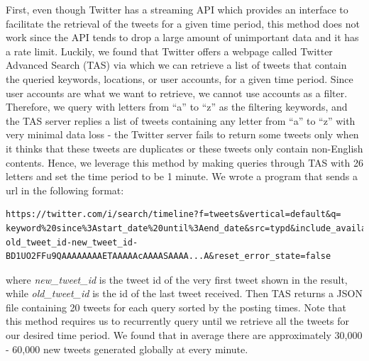 \documentclass[letterpaper,12pt]{article}
\begin{document}
First, even though Twitter has a streaming API which provides an interface to facilitate the retrieval of the tweets for a given time period, this method does not work since the API tends to drop a large amount of unimportant data and it has a rate limit. Luckily, we found that Twitter offers a webpage called Twitter Advanced Search (TAS) via which we can retrieve a list of tweets that contain the queried keywords, locations, or user accounts, for a given time period.
Since user accounts are what we want to
retrieve, we cannot use accounts as a filter. Therefore, 
we query with letters from ``a'' to ``z'' as the filtering keywords, 
and the TAS server replies a list of tweets containing any letter from ``a'' to ``z''
with very minimal data loss - the Twitter server fails to return some tweets only when it thinks that these tweets are duplicates or these tweets only contain non-English contents. Hence, we leverage this method by making
queries through TAS with 26 letters and set the time period to be 1 minute.
We wrote a program that sends a url in the following format:
\begin{lstlisting}[basicstyle=\scriptsize]
https://twitter.com/i/search/timeline?f=tweets&vertical=default&q= keyword%20since%3Astart_date%20until%3Aend_date&src=typd&include_available_features=1&include_entities=1&lang=en&max_position=TWEET-old_tweet_id-new_tweet_id-BD1UO2FFu9QAAAAAAAAETAAAAAcAAAASAAAA...A&reset_error_state=false
\end{lstlisting}
where \emph{new\_tweet\_id} is the tweet id of the very first tweet
shown in the result, while \emph{old\_tweet\_id} is the id of the 
last tweet received. Then TAS returns a JSON file containing 20 tweets
for each query sorted by the posting times. Note that this method requires us to recurrently query until we retrieve all the tweets for our desired time period. We
found that in average there are approximately 30,000 - 60,000 new
tweets generated globally at every minute. 
\end{document}
